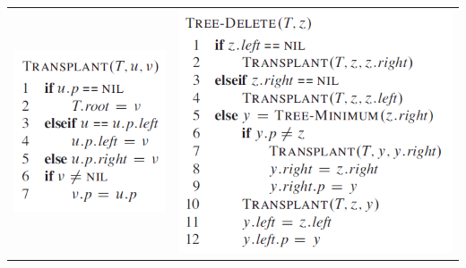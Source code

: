 \documentclass[11pt,a4paper]{article}
\begin{document}
\begin{tabular}{l l}
\includegraphics[scale=0.4]{img/tree8.png} & \includegraphics[scale=0.4]{img/tree9.png}\\
\end{tabular}
\end{document}
